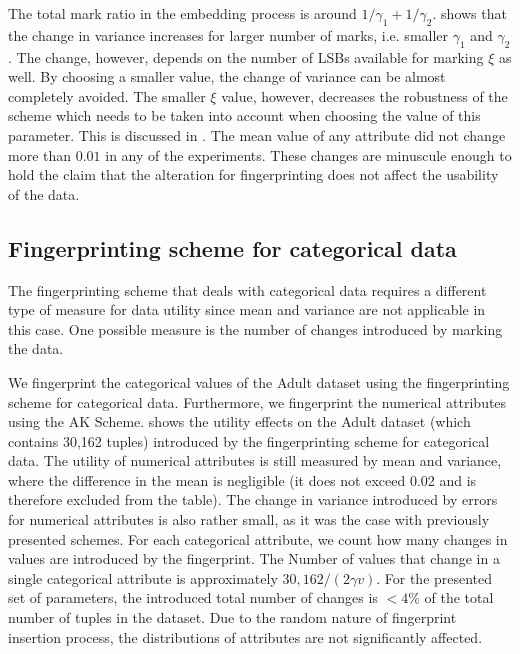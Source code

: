 The total mark ratio in the embedding process is around $1/\gamma_1 + 1/\gamma_2$. 
 shows that the change in variance increases for larger number of marks, i.e. smaller $\gamma_1$ and $\gamma_2$. 
The change, however, depends on the number of LSBs available for marking $\xi$ as well. 
By choosing a smaller value, the change of variance can be almost completely avoided. The smaller $\xi$ value, however, decreases the robustness of the scheme which needs to be taken into account when choosing the value of this parameter. This is discussed in .
The mean value of any attribute did not change more than $0.01$ in any of the experiments.
These changes are minuscule enough to hold the claim that the alteration for fingerprinting does not affect the usability of the data.


\subsection{Fingerprinting scheme for categorical data}
The fingerprinting scheme that deals with categorical data requires a different type of measure for data utility since mean and variance are not applicable in this case. One possible measure is the number of changes introduced by marking the data.

We fingerprint the categorical values of the Adult dataset using the fingerprinting scheme for categorical data. Furthermore, we fingerprint the numerical attributes using the AK Scheme. 
 shows the utility effects on the Adult dataset (which contains 30,162 tuples) introduced by the fingerprinting scheme for categorical data. 
The utility of numerical attributes is still measured by mean and variance, where the difference in the mean is negligible (it does not exceed 0.02 and is therefore excluded from the table). The change in variance introduced by errors for numerical attributes is also rather small, as it was the case with previously presented schemes. 
For each categorical attribute, we count how many changes in values are introduced by the fingerprint.
The Number of values that change in a single categorical attribute is approximately $30,162/(2\gamma v )$. 
For the presented set of parameters, the introduced total number of changes is $<4\%$ of the total number of tuples in the dataset. 
Due to the random nature of fingerprint insertion process, the distributions of attributes are not significantly affected.


